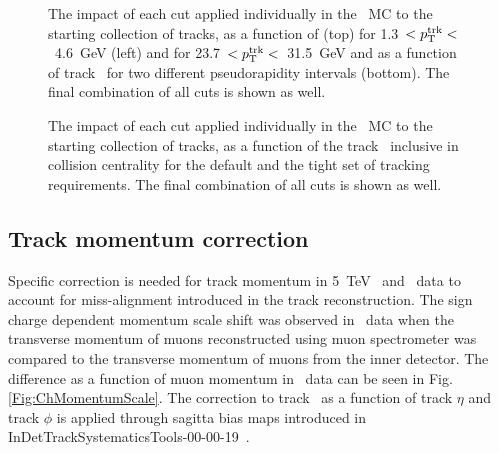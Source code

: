 \begin{figure}
{\begin{tabular}{cc}
\end{tabular} }
\caption{The impact of each cut applied individually in the \pp\ MC 
to the starting collection of tracks, as a function of
\etatrk (top) for 1.3~$< \mbox{$p_{\mathrm{T}}^{\mathrm{trk}}$}<$~4.6~GeV (left) and for 23.7~$<\mbox{$p_{\mathrm{T}}^{\mathrm{trk}}$}<$~31.5~GeV and as a function of track \pT\ for two different pseudorapidity intervals (bottom).  The final combination of all cuts is shown as well.}
\label{fig:ppcutflow_eta}
\end{figure}

\begin{figure}
\caption{The impact of each cut applied individually in the \PbPb\ MC 
to the starting collection of tracks, as a function of the track \pT\ inclusive in collision centrality for the default and the tight set of tracking requirements. The final combination of all cuts
is shown as well.}
\label{fig:PbPbcutflow_eta}
\end{figure}




\subsection{Track momentum correction}
\label{Sec:Trackmomentumcorrection}
Specific correction is needed for track momentum in 5~TeV \pp\ and \PbPb\ data to account for miss-alignment introduced in the track reconstruction. The sign charge dependent momentum scale shift was observed in \pp\ data when the transverse momentum of muons reconstructed using muon spectrometer was compared to the transverse momentum of muons from the inner detector. The difference as a function of muon momentum in \pbpb\ data can be seen in Fig.\ref{Fig:ChMomentumScale}. The correction to track \pt\ as a function of track $\eta$ and track $\phi$ is applied through sagitta bias maps introduced in InDetTrackSystematicsTools-00-00-19~\cite{TrackingRec}.

